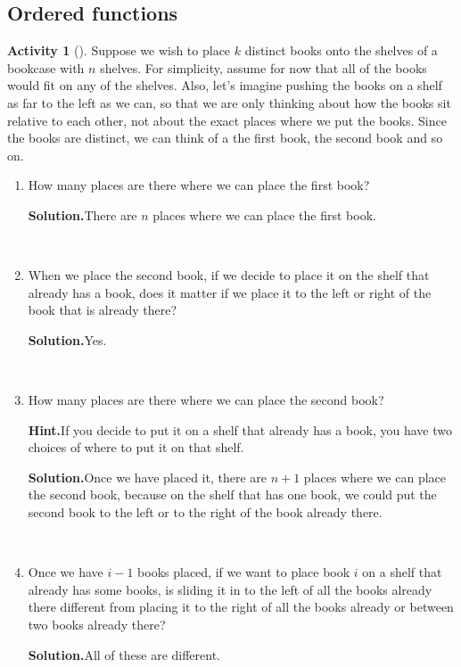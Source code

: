 \documentclass[10pt,]{book}
\theoremstyle{plain}
\theoremstyle{definition}
\newtheorem{activity}[project]{Activity}
\numberwithin{equation}{chapter}
\begin{document}
\subsection[{Ordered functions}]{Ordered functions}\label{orderedfunctionsection}
\begin{activity}[]\label{bookcase}
Suppose we wish to place \(k\) distinct books onto the shelves of a bookcase with \(n\) shelves. For simplicity, assume for now that all of the books would fit on any of the shelves. Also, let's imagine pushing the books on a shelf as far to the left as we can, so that we are only thinking about how the books sit relative to each other, not about the exact places where we put the books. Since the books are distinct, we can think of a the first book, the second book and so on.%
~\par
\begin{enumerate}[label=(\alph*)]
 \item How many places are there where we can place the first book?%
\par\medskip\noindent%
\textbf{Solution.}\quad There are \(n\) places where we can place the first book.%

~\par
\item When we place the second book, if we decide to place it on the shelf that already has a book, does it matter if we place it to the left or right of the book that is already there?%
\par\medskip\noindent%
\textbf{Solution.}\quad Yes.%

~\par
\item How many places are there where we can place the second book?%
\par\medskip\noindent%
\textbf{Hint.}\quad If you decide to put it on a shelf that already has a book, you have two choices of where to put it on that shelf.%
\par\medskip\noindent%
\textbf{Solution.}\quad Once we have placed it, there are \(n+1\) places where we can place the second book, because on the shelf that has one book, we could put the second book to the left or to the right of the book already there.%

~\par
\item Once we have \(i-1\) books placed, if we want to place book \(i\)  on a shelf that already has some books, is sliding it in to the left of all the books already there different from placing it to the right of all the books already or between two books already there?%
\par\medskip\noindent%
\textbf{Solution.}\quad All of these are different.%


\end{enumerate}
\end{activity}
\end{document}
